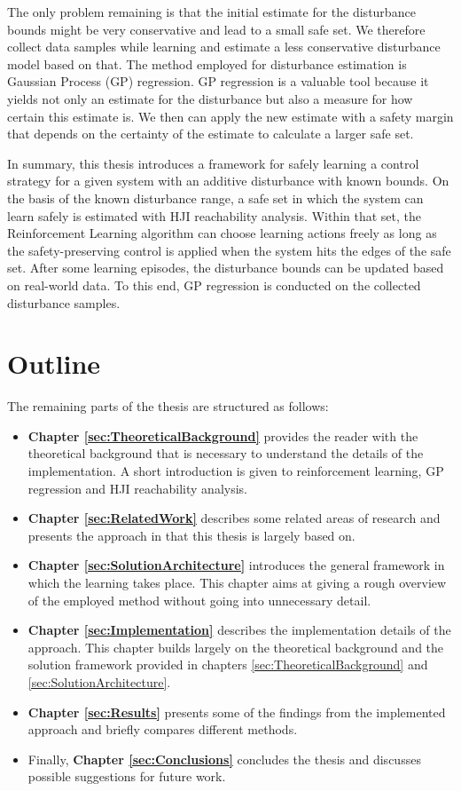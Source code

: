 \documentclass[../main.tex]{subfiles}
\begin{document}
The only problem remaining is that the initial estimate for the disturbance bounds might be very conservative and lead to a small safe set. We therefore collect data samples while learning and estimate a less conservative disturbance model based on that. The method employed for disturbance estimation is Gaussian Process (GP) regression. GP regression is a valuable tool because it yields not only an estimate for the disturbance but also a measure for how certain this estimate is. We then can apply the new estimate with a safety margin that depends on the certainty of the estimate to calculate a larger safe set.

In summary, this thesis introduces a framework for safely learning a control strategy for a given system with an additive disturbance with known bounds. On the basis of the known disturbance range, a safe set in which the system can learn safely is estimated with HJI reachability analysis. Within that set, the Reinforcement Learning algorithm can choose learning actions freely as long as the safety-preserving control is applied when the system hits the edges of the safe set. After some learning episodes, the disturbance bounds can be updated based on real-world data. To this end, GP regression is conducted on the collected disturbance samples. 

\section{Outline}
The remaining parts of the thesis are structured as follows:
\begin{itemize}
\item \textbf{Chapter \ref{sec:TheoreticalBackground}} provides the reader with the theoretical background that is necessary to understand the details of the implementation. A short introduction is given to reinforcement learning, GP regression and HJI reachability analysis.
\item \textbf{Chapter \ref{sec:RelatedWork}} describes some related areas of research and presents the approach in \cite{akametalu2014reachability} that this thesis is largely based on.
\item \textbf{Chapter \ref{sec:SolutionArchitecture}} introduces the general framework in which the learning takes place. This chapter aims at giving a rough overview of the employed method without going into unnecessary detail.
\item \textbf{Chapter \ref{sec:Implementation}} describes the implementation details of the approach. This chapter builds largely on the theoretical background and the solution framework provided in chapters \ref{sec:TheoreticalBackground} and \ref{sec:SolutionArchitecture}.
\item  \textbf{Chapter \ref{sec:Results}} presents some of the findings from the implemented approach and briefly compares different methods.
\item Finally, \textbf{Chapter \ref{sec:Conclusions}} concludes the thesis and discusses possible suggestions for future work.
\end{itemize}
\end{document}
